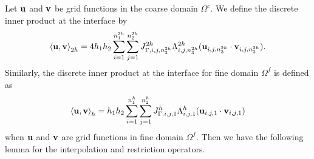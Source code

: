 {{ 
Let ${\bf u}$ and ${\bf v}$ be grid functions in the coarse domain $\Omega^c$. We define the discrete inner product at the interface by
\begin{equation}\label{scalar_product_discrete_interface_c}
\left<{\bf u}, {\bf v}\right>_{2h} = 4h_1h_2\sum_{i=1}^{n_1^{2h}}\sum_{j=1}^{n_2^{2h}}{  J}_{\Gamma,i,j,n_3^{2h}}^{2h}\Lambda_{i,j,n_3^{2h}}^{2h}({\bf u}_{i,j,n_3^{2h}}\cdot {\bf v}_{i,j,n_3^{2h}}).
\end{equation}
 Similarly, the discrete inner product at the interface for fine domain $\Omega^f$ is defined as
\begin{equation}\label{scalar_product_discrete_interface_f}
\left<{\bf u}, {\bf v}\right>_{h} = h_1h_2\sum_{i=1}^{n_1^{h}}\sum_{j=1}^{n_2^{h}}{J}_{\Gamma,i,j,1}^h\Lambda_{i,j,1}^h({\bf u}_{i,j,1}\cdot {\bf v}_{i,j,1})
\end{equation}
when $\bf u$ and $\bf v$ are grid functions in fine domain $\Omega^f$. Then we have the following lemma for the interpolation and restriction operators.
 
}}
